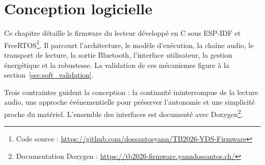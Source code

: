 \chapter{Conception logicielle}
\label{chap:software}

Ce chapitre détaille le firmware du lecteur développé en C sous ESP-IDF et FreeRTOS\footnote{Code source : \url{https://github.com/dossantosyann/TB2026-YDS-Firmware}}. Il parcourt l'architecture, le modèle d'exécution, la chaîne audio, le transport de lecture, la sortie Bluetooth, l'interface utilisateur, la gestion énergétique et la robustesse. La validation de ces mécanismes figure à la section~\ref{sec:soft_validation}.

Trois contraintes guident la conception : la continuité ininterrompue de la lecture audio, une approche événementielle pour préserver l'autonomie et une simplicité proche du matériel. L'ensemble des interfaces est documenté avec Doxygen\footnote{Documentation Doxygen : \url{https://tb2026-firmware.yanndossantos.ch/}}.